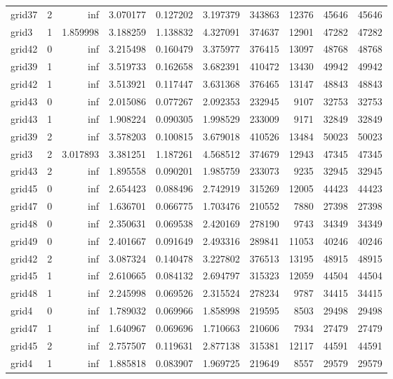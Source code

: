 \begin{longtable}{|l|r|r|r|r|r|r|r|r|r|}
grid37 & 2 & inf & 3.070177 & 0.127202 & 3.197379 & 343863 & 12376 & 45646 & 45646 \\
grid3 & 1 & 1.859998 & 3.188259 & 1.138832 & 4.327091 & 374637 & 12901 & 47282 & 47282 \\
grid42 & 0 & inf & 3.215498 & 0.160479 & 3.375977 & 376415 & 13097 & 48768 & 48768 \\
grid39 & 1 & inf & 3.519733 & 0.162658 & 3.682391 & 410472 & 13430 & 49942 & 49942 \\
grid42 & 1 & inf & 3.513921 & 0.117447 & 3.631368 & 376465 & 13147 & 48843 & 48843 \\
grid43 & 0 & inf & 2.015086 & 0.077267 & 2.092353 & 232945 & 9107 & 32753 & 32753 \\
grid43 & 1 & inf & 1.908224 & 0.090305 & 1.998529 & 233009 & 9171 & 32849 & 32849 \\
grid39 & 2 & inf & 3.578203 & 0.100815 & 3.679018 & 410526 & 13484 & 50023 & 50023 \\
grid3 & 2 & 3.017893 & 3.381251 & 1.187261 & 4.568512 & 374679 & 12943 & 47345 & 47345 \\
grid43 & 2 & inf & 1.895558 & 0.090201 & 1.985759 & 233073 & 9235 & 32945 & 32945 \\
grid45 & 0 & inf & 2.654423 & 0.088496 & 2.742919 & 315269 & 12005 & 44423 & 44423 \\
grid47 & 0 & inf & 1.636701 & 0.066775 & 1.703476 & 210552 & 7880 & 27398 & 27398 \\
grid48 & 0 & inf & 2.350631 & 0.069538 & 2.420169 & 278190 & 9743 & 34349 & 34349 \\
grid49 & 0 & inf & 2.401667 & 0.091649 & 2.493316 & 289841 & 11053 & 40246 & 40246 \\
grid42 & 2 & inf & 3.087324 & 0.140478 & 3.227802 & 376513 & 13195 & 48915 & 48915 \\
grid45 & 1 & inf & 2.610665 & 0.084132 & 2.694797 & 315323 & 12059 & 44504 & 44504 \\
grid48 & 1 & inf & 2.245998 & 0.069526 & 2.315524 & 278234 & 9787 & 34415 & 34415 \\
grid4 & 0 & inf & 1.789032 & 0.069966 & 1.858998 & 219595 & 8503 & 29498 & 29498 \\
grid47 & 1 & inf & 1.640967 & 0.069696 & 1.710663 & 210606 & 7934 & 27479 & 27479 \\
grid45 & 2 & inf & 2.757507 & 0.119631 & 2.877138 & 315381 & 12117 & 44591 & 44591 \\
grid4 & 1 & inf & 1.885818 & 0.083907 & 1.969725 & 219649 & 8557 & 29579 & 29579 \\

\end{longtable}
